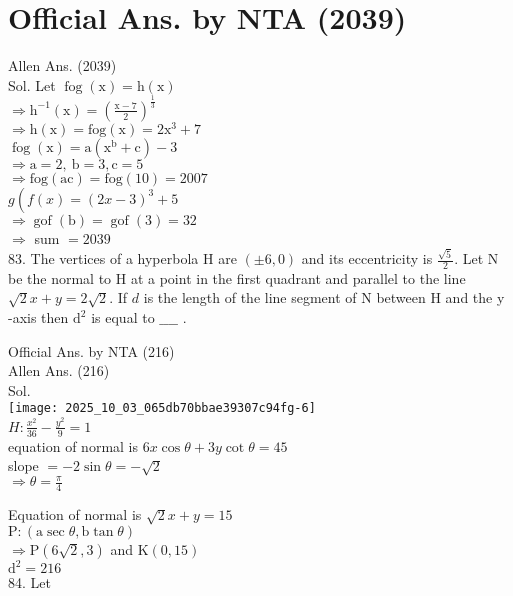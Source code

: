\documentclass[10pt]{article}
\begin{document}
\section*{Official Ans. by NTA (2039)}
Allen Ans. (2039)\\
Sol. Let \(\operatorname{fog}(\mathrm{x})=\mathrm{h}(\mathrm{x})\)\\
\(\Rightarrow \mathrm{h}^{-1}(\mathrm{x})=\left(\frac{\mathrm{x}-7}{2}\right)^{\frac{1}{3}}\)\\
\(\Rightarrow \mathrm{h}(\mathrm{x})=\mathrm{fog}(\mathrm{x})=2 \mathrm{x}^{3}+7\)\\
\(\operatorname{fog}(\mathrm{x})=\mathrm{a}\left(\mathrm{x}^{\mathrm{b}}+\mathrm{c}\right)-3\)\\
\(\Rightarrow \mathrm{a}=2, \mathrm{~b}=3, \mathrm{c}=5\)\\
\(\Rightarrow \mathrm{fog}(\mathrm{ac})=\mathrm{fog}(10)=2007\)\\
\(g\left(f(x)=(2 x-3)^{3}+5\right.\)\\
\(\Rightarrow \operatorname{gof}(\mathrm{b})=\operatorname{gof}(3)=32\)\\
\(\Rightarrow\) sum \(=2039\)\\
83. The vertices of a hyperbola H are \(( \pm 6,0)\) and its eccentricity is \(\frac{\sqrt{5}}{2}\). Let N be the normal to H at a point in the first quadrant and parallel to the line \(\sqrt{2} x+y=2 \sqrt{2}\). If \(d\) is the length of the line segment of N between H and the y -axis then \(\mathrm{d}^{2}\) is equal to \(\_\_\_\_\) .

Official Ans. by NTA (216)\\
Allen Ans. (216)\\
Sol.\\
\texttt{[image: 2025\_10\_03\_065db70bbae39307c94fg-6]}\\
\(H: \frac{x^{2}}{36}-\frac{y^{2}}{9}=1\)\\
equation of normal is \(6 x \cos \theta+3 y \cot \theta=45\)\\
slope \(=-2 \sin \theta=-\sqrt{2}\)\\
\(\Rightarrow \theta=\frac{\pi}{4}\)

Equation of normal is \(\sqrt{2} x+y=15\)\\
\(\mathrm{P}:(\mathrm{a} \sec \theta, \mathrm{b} \tan \theta)\)\\
\(\Rightarrow \mathrm{P}(6 \sqrt{2}, 3)\) and \(\mathrm{K}(0,15)\)\\
\(\mathrm{d}^{2}=216\)\\
84. Let
\end{document}
